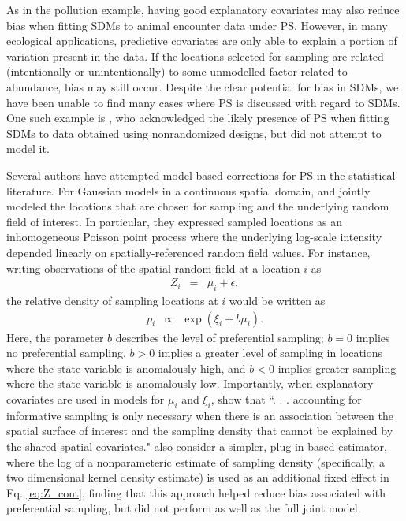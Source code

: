 \documentclass[times,mee,doublespace,]{besauth2}
\begin{document}
As in the pollution example, having good explanatory covariates may also reduce bias when fitting SDMs to animal encounter data under PS.  However, in many ecological applications, predictive covariates are only able to explain a portion of variation present in the data.  If the locations selected for sampling are related (intentionally or unintentionally) to some unmodelled factor related to abundance, bias may still occur.  Despite the clear potential for bias in SDMs, we have been unable to find many cases where PS \citep[\textit{sensu}][]{DiggleEtAl2010} is discussed with regard to SDMs.  One such example is
\citet{ChakrabortyEtAl2010}, who acknowledged the likely presence of PS when fitting SDMs to data obtained using nonrandomized designs, but did not attempt to model it.

Several authors have attempted model-based corrections for PS in the statistical literature. For Gaussian models in a continuous spatial domain, \citet{DiggleEtAl2010} and \citet{PatiEtAl2011} jointly modeled the locations that are chosen for sampling and the underlying random field of interest.  In particular, they expressed sampled locations as an inhomogeneous Poisson point process where the underlying log-scale intensity depended linearly on spatially-referenced random field values.  For instance, writing observations of the spatial random field at a location $i$ as
\begin{eqnarray}
   Z_i & = & \mu_i + \epsilon,
   \label{eq:Z_cont}
\end{eqnarray}
the relative density of sampling locations at $i$ would be written as
\begin{eqnarray}
   p_i & \propto & \exp(\xi_i + b \mu_i).
   \label{eq:p_cont}
\end{eqnarray}
Here, the parameter $b$ describes the level of preferential sampling; $b=0$ implies no preferential sampling, $b>0$ implies a greater level of sampling in locations where the state variable is anomalously high, and $b<0$ implies greater sampling where the state variable is anomalously low.  Importantly, when explanatory covariates are used in models for $\mu_i$ and $\xi_i$, \citet{PatiEtAl2011} show that ``. . . accounting for informative sampling is only necessary when there
is an association between the spatial surface of interest and the sampling density that cannot be
explained by the shared spatial covariates."  \citet{PatiEtAl2011} also consider a simpler, plug-in based estimator, where the log of a nonparameteric estimate of sampling density (specifically, a two dimensional kernel density estimate) is used as an additional fixed effect in Eq. \ref{eq:Z_cont}, finding that this approach helped reduce bias associated with preferential sampling, but did not perform as well as the full joint model.
\end{document}
